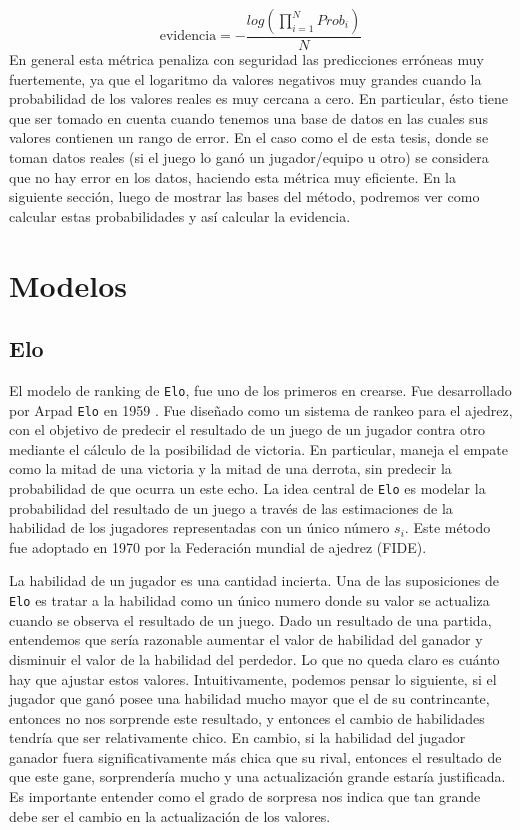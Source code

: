 \documentclass[11pt,twoside,spanish]{report} %
\begin{document}
\begin{equation}
	\text{evidencia} = -\frac{log(\prod_{i=1}^{N}Prob_i)}{N}
\end{equation}
En general esta m\'etrica penaliza con seguridad las predicciones err\'oneas muy fuertemente, ya que el logaritmo da valores negativos muy grandes cuando la probabilidad de los valores reales es muy cercana a cero.
En particular, \'esto tiene que ser tomado en cuenta cuando tenemos una base de datos en las cuales sus valores contienen un rango de error.
En el caso como el de esta tesis, donde se toman datos reales (si el juego lo gan\'o un jugador/equipo u otro) se considera que no hay error en los datos, haciendo esta m\'etrica muy eficiente.
En la siguiente secci\'on, luego de mostrar las bases del m\'etodo, podremos ver como calcular estas probabilidades y as\'i calcular la evidencia.


\section{Modelos}\label{Sec:Modelos}


\subsection{Elo}
El modelo de ranking de \texttt{Elo}, fue uno de los primeros en crearse. Fue desarrollado por Arpad \texttt{Elo} en 1959 \cite{elo1961-uscf}.
Fue dise\~nado como un sistema de rankeo para el ajedrez, con el objetivo de predecir el resultado de un juego de un jugador contra otro mediante el c\'alculo de la posibilidad de victoria.
En particular, maneja el empate como la mitad de una victoria y la mitad de una derrota, sin predecir la probabilidad de que ocurra un este echo.
La idea central de \texttt{Elo} es modelar la probabilidad del resultado de un juego a trav\'es de las estimaciones de la habilidad de los jugadores representadas con un \'unico n\'umero $s_i$.
Este m\'etodo fue adoptado en 1970 por la Federaci\'on mundial de ajedrez (FIDE).


La habilidad de un jugador es una cantidad incierta.
Una de las suposiciones de \texttt{Elo} es tratar a la habilidad como un \'unico numero donde su valor se actualiza cuando se observa el resultado de un juego.
Dado un resultado de una partida, entendemos que ser\'ia razonable aumentar el valor de habilidad del ganador y disminuir el valor de la habilidad del perdedor.
Lo que no queda claro es cu\'anto hay que ajustar estos valores.
Intuitivamente, podemos pensar lo siguiente, si el jugador que gan\'o posee una habilidad mucho mayor que el de su contrincante, entonces no nos sorprende este resultado, y entonces el cambio de habilidades tendr\'ia que ser relativamente chico.
En cambio,  si la habilidad del jugador ganador fuera significativamente m\'as chica que su rival, entonces el resultado de que este gane, sorprender\'ia mucho y una actualizaci\'on grande estar\'ia justificada.
Es importante entender como el grado de sorpresa nos indica que tan grande debe ser el cambio en la actualizaci\'on de los valores.
\end{document}
